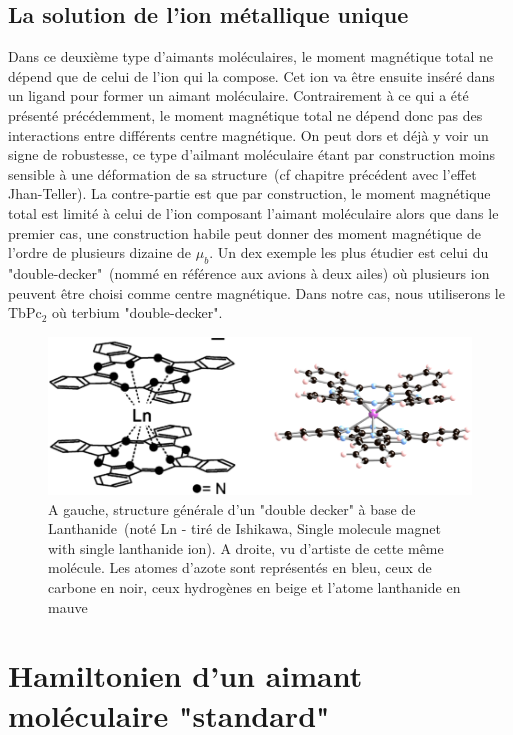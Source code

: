\subsection{La solution de l'ion métallique unique}
Dans ce deuxième type d'aimants moléculaires, le moment magnétique total ne dépend que de celui de l'ion qui la compose. Cet ion va \^etre ensuite inséré dans un ligand pour former un aimant moléculaire. Contrairement à ce qui a été présenté précédemment, le moment magnétique total ne dépend donc pas des interactions entre différents centre magnétique. On peut dors et déjà y voir un signe de robustesse, ce type d'ailmant moléculaire étant par construction moins sensible à une déformation de sa structure~(cf chapitre précédent avec l'effet Jhan-Teller). La contre-partie est que par construction, le moment magnétique total est limité à celui de l'ion composant l'aimant moléculaire alors que dans le premier cas, une construction habile peut donner des moment magnétique de l'ordre de plusieurs dizaine de $\mu_b$. Un dex exemple les plus étudier est celui du "double-decker"~(nommé en référence aux avions à deux ailes) où plusieurs ion peuvent \^etre choisi comme centre magnétique. Dans notre cas, nous utiliserons le TbPc$_2$ où terbium "double-decker".

\begin{figure}
\centering \includegraphics[scale=0.5]{Theorie/MagMol/figure2/figure2.png} 
\caption{A gauche, structure générale d'un "double decker" à base de Lanthanide~(noté Ln - tiré de Ishikawa, Single molecule magnet with single lanthanide ion). A droite, vu d'artiste de cette m\^eme molécule. Les atomes d'azote sont représentés en bleu, ceux de carbone en noir, ceux hydrogènes en beige et l'atome lanthanide en mauve}
\label{TbPc2}
\end{figure}

\section{Hamiltonien d'un aimant moléculaire "standard"}
